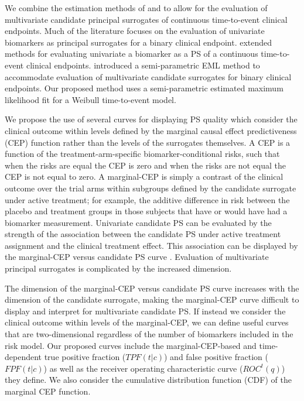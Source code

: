 \documentclass[times, doublespace]{simauth}
\begin{document}
We combine the estimation methods of \citet{Gabriel13} and  \citet{Huang11}  to allow for the evaluation of multivariate candidate principal surrogates of continuous time-to-event clinical endpoints. Much of the literature focuses on the evaluation of univariate biomarkers as principal surrogates for a binary clinical endpoint. \citet{Gabriel13} extended methods for evaluating univariate a biomarker as a PS of a continuous time-to-event clinical endpoints. \citet{Huang11} introduced a semi-parametric EML method to accommodate evaluation of multivariate candidate surrogates for binary clinical endpoints.  Our proposed method uses a semi-parametric estimated maximum likelihood fit for a Weibull time-to-event model. 

We propose the use of several curves for displaying PS quality which consider the clinical outcome within levels defined by the marginal causal effect predictiveness (CEP) function rather than the levels of the surrogates themselves. A CEP is a function of the treatment-arm-specific biomarker-conditional risks, such that when the risks are equal the CEP is zero and when the risks are not equal the CEP is not equal to zero. A marginal-CEP is simply a contrast of the clinical outcome over the trial arms within subgroups defined by the candidate surrogate under active treatment; for example, the additive difference in risk between the placebo and treatment groups in those subjects that have or would have had a biomarker measurement. Univariate candidate PS can be evaluated by the strength of the association between the candidate PS under active treatment assignment and the clinical treatment effect. This association can be displayed by the marginal-CEP versus candidate PS curve \citep{Gilbert08}. Evaluation of multivariate principal surrogates is complicated by the increased dimension.  


The dimension of the marginal-CEP versus candidate PS curve increases with the dimension of the candidate surrogate, making the marginal-CEP curve difficult to display and interpret for multivariate candidate PS. If instead we consider the clinical outcome within levels of the marginal-CEP, we can define useful curves that are two-dimensional regardless of the number of biomarkers included in the risk model. Our proposed curves include the marginal-CEP-based and time-dependent true positive fraction ($TPF(t|c)$) and false positive fraction ($FPF(t|c)$) as well as the receiver operating characteristic curve ($ROC^{t}(q)$) they define. We also consider the cumulative distribution function (CDF) of the marginal CEP function. 
\end{document}
